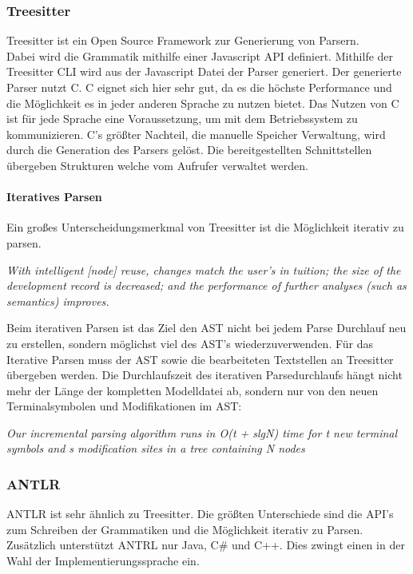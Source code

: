 \documentclass[./einleitung.tex]{subfiles}
\begin{document}
\subsubsection{Treesitter}
Treesitter ist ein Open Source Framework zur Generierung von Parsern. \\
Dabei wird die Grammatik mithilfe einer Javascript API definiert. Mithilfe der Treesitter CLI wird aus der Javascript Datei der Parser generiert. 
Der generierte Parser nutzt C. C eignet sich hier sehr gut, da es die höchste Performance und die Möglichkeit es in jeder anderen Sprache zu nutzen bietet. Das Nutzen von C ist für jede Sprache eine Voraussetzung, um mit dem Betriebssystem zu kommunizieren.
C's größter Nachteil, die manuelle Speicher Verwaltung, wird durch die Generation des Parsers gelöst. Die bereitgestellten Schnittstellen übergeben Strukturen welche vom Aufrufer verwaltet werden. 
\paragraph{Iteratives Parsen}
Ein großes Unterscheidungsmerkmal von Treesitter ist die Möglichkeit iterativ zu parsen.
\newline
 \begin{center}
 \textit{With intelligent [node] reuse, changes match the user’s in
tuition; the size of the development record is decreased; and the performance
 of further analyses (such as semantics) improves.\cite{twagner}}
 \end{center}
Beim iterativen Parsen ist das Ziel den AST nicht bei jedem Parse Durchlauf neu zu erstellen, sondern möglichst viel des AST's wiederzuverwenden. Für das Iterative Parsen muss der AST sowie die bearbeiteten Textstellen an Treesitter übergeben werden. Die Durchlaufszeit des iterativen Parsedurchlaufs hängt nicht mehr der Länge der kompletten Modelldatei ab, sondern nur von den neuen Terminalsymbolen und Modifikationen im AST:
 \newline
 \begin{center}
 \textit{Our incremental parsing algorithm runs in O(t + slgN) time for t new terminal symbols and s modification sites in a tree containing N nodes \cite{twagner}}
 \end{center}
\subsubsection{ANTLR}
ANTLR ist sehr ähnlich zu Treesitter. Die größten Unterschiede sind die API's zum Schreiben der Grammatiken und die Möglichkeit iterativ zu Parsen.
Zusätzlich unterstützt ANTRL nur Java, C\# und C++. Dies zwingt einen in der Wahl der Implementierungssprache ein. 
\end{document}
